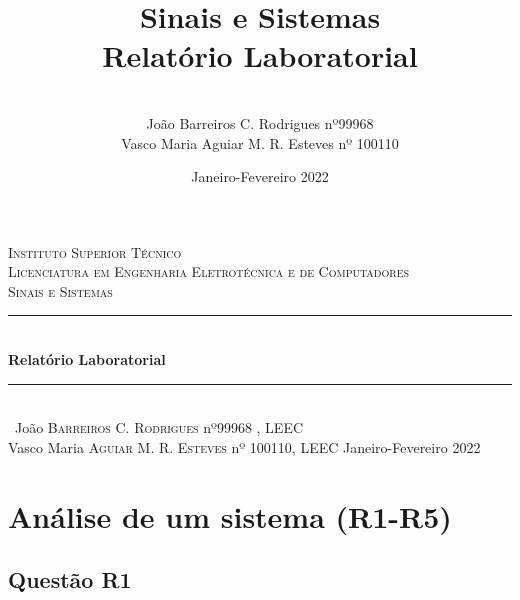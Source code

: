 \documentclass[a4paper,12pt]{article}
\date{Janeiro-Fevereiro 2022}
\title{Sinais e Sistemas \\ \large {Relatório Laboratorial}}
\author{
\\ João Barreiros C. Rodrigues nº99968
\\Vasco Maria  Aguiar M. R. Esteves nº 100110 }
\begin{document}
	\begin{titlepage} %
        \newcommand{\HRule}{\rule{\linewidth}{0.5mm}} %
        \center %
        \textsc{\LARGE Instituto Superior Técnico}\\[1.5cm] %
	\textsc{\Large Licenciatura em Engenharia Eletrotécnica e de Computadores}\\[0.25cm]
        \textsc{\Large Sinais e Sistemas}\\[0.5cm] %
        \HRule\\[0.4cm]
        {\huge\bfseries Relatório Laboratorial}\\[0.4cm] %
        \HRule\\[1.5cm]\
        João \textsc{Barreiros C. Rodrigues} nº99968 , LEEC\\
	Vasco Maria \textsc{Aguiar M. R. Esteves} nº 100110, LEEC
        \vfill\vfill\vfill %
        {\large Janeiro-Fevereiro 2022} %
        \vfill %
\end{titlepage}
	\newpage
		\tableofcontents
	\newpage
	\section{Análise de um sistema (R1-R5)}
		\subsection{Questão R1}
\end{document}
